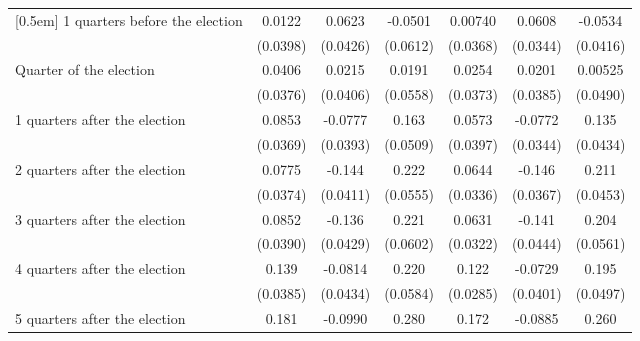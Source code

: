 \begin{table}[!ht]
\begin{tabular}{l*{6}{c}}
[0.5em]
 1 quarters before the election&      0.0122         &      0.0623         &     -0.0501         &     0.00740         &      0.0608         &     -0.0534         \\
                    &    (0.0398)         &    (0.0426)         &    (0.0612)         &    (0.0368)         &    (0.0344)         &    (0.0416)         \\
[0.5em]
Quarter of the election&      0.0406         &      0.0215         &      0.0191         &      0.0254         &      0.0201         &     0.00525         \\
                    &    (0.0376)         &    (0.0406)         &    (0.0558)         &    (0.0373)         &    (0.0385)         &    (0.0490)         \\
[0.5em]
 1 quarters after the election&      0.0853\sym{*}  &     -0.0777\sym{*}  &       0.163\sym{**} &      0.0573         &     -0.0772\sym{*}  &       0.135\sym{**} \\
                    &    (0.0369)         &    (0.0393)         &    (0.0509)         &    (0.0397)         &    (0.0344)         &    (0.0434)         \\
[0.5em]
 2 quarters after the election&      0.0775\sym{*}  &      -0.144\sym{***}&       0.222\sym{***}&      0.0644         &      -0.146\sym{***}&       0.211\sym{***}\\
                    &    (0.0374)         &    (0.0411)         &    (0.0555)         &    (0.0336)         &    (0.0367)         &    (0.0453)         \\
[0.5em]
 3 quarters after the election&      0.0852\sym{*}  &      -0.136\sym{**} &       0.221\sym{***}&      0.0631         &      -0.141\sym{**} &       0.204\sym{***}\\
                    &    (0.0390)         &    (0.0429)         &    (0.0602)         &    (0.0322)         &    (0.0444)         &    (0.0561)         \\
[0.5em]
 4 quarters after the election&       0.139\sym{***}&     -0.0814         &       0.220\sym{***}&       0.122\sym{***}&     -0.0729         &       0.195\sym{***}\\
                    &    (0.0385)         &    (0.0434)         &    (0.0584)         &    (0.0285)         &    (0.0401)         &    (0.0497)         \\
[0.5em]
 5 quarters after the election&       0.181\sym{***}&     -0.0990\sym{*}  &       0.280\sym{***}&       0.172\sym{***}&     -0.0885\sym{*}  &       0.260\sym{***}\\

\end{tabular}
\end{table}
